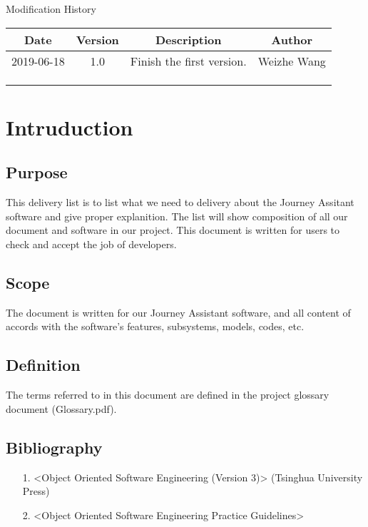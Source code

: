\documentclass[10pt]{article}
\begin{document}
\newpage

\begin{center}
    {\LARGE Modification History}
    
    \begin{tabular}{|c|c|c|c|} 
        \hline 
        Date&Version&Description&Author\\
        \hline  
        2019-06-18&1.0&Finish the first version.&Weizhe Wang\\
		\hline 
		& & & \\
		\hline
		& & & \\
		\hline
		& & & \\
		\hline
    \end{tabular}    
\end{center}

\newpage

\tableofcontents
\newpage

\section{Intruduction}
\subsection{Purpose}
This delivery list is to list what we need to delivery about the Journey Assitant software and give proper explanition. The list will show composition of all our document and software in our project. This document is written for users to check and accept the job of developers.

\subsection{Scope}
The document is written for our Journey Assistant software, and all content of accords with the software's features, subsystems, models, codes, etc.

\subsection{Definition}
The terms referred to in this document are defined in the project glossary document (Glossary.pdf).

\subsection{Bibliography}
\begin{itemize}
	\item[1.] <Object Oriented Software Engineering (Version 3)> (Tsinghua University Press)
	\item[2.] <Object Oriented Software Engineering Practice Guidelines> 
\end{itemize}
\end{document}
